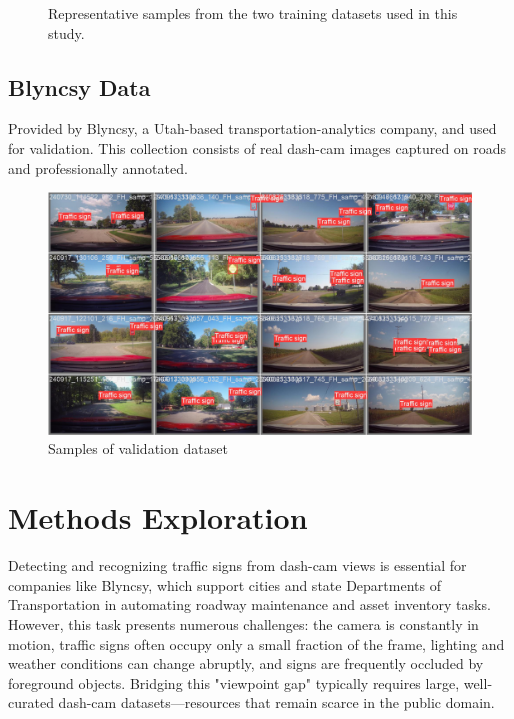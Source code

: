 \documentclass[journal]{IEEEtran}
\begin{document}
\begin{figure}[h]
    \caption{Representative samples from the two training datasets used in this study.}
    \label{fig:datasets_overview}
\end{figure}

\subsection{Blyncsy Data}
Provided by Blyncsy, a Utah-based transportation-analytics company, and used for validation. This collection consists of real dash-cam images captured on roads and professionally annotated.

\begin{figure}[h]
    \centering
    \includegraphics[width=\linewidth]{images/dashcam.jpg}
    \caption{Samples of validation dataset}
    \label{fig:row_of_images}
\end{figure}

\section{Methods Exploration}
Detecting and recognizing traffic signs from dash-cam views is essential for companies like Blyncsy, which support cities and state Departments of Transportation in automating roadway maintenance and asset inventory tasks. However, this task presents numerous challenges: the camera is constantly in motion, traffic signs often occupy only a small fraction of the frame, lighting and weather conditions can change abruptly, and signs are frequently occluded by foreground objects. Bridging this "viewpoint gap" typically requires large, well-curated dash-cam datasets—resources that remain scarce in the public domain.
\end{document}

